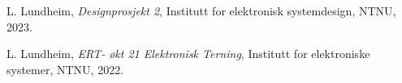 
  L. Lundheim,
  \emph{Designprosjekt 2},
  Institutt for elektronisk systemdesign,
  NTNU,
  2023.

  L. Lundheim,
  \emph{ERT- økt 21 Elektronisk Terning},
  Institutt for elektroniske systemer,
  NTNU,
  2022.
  